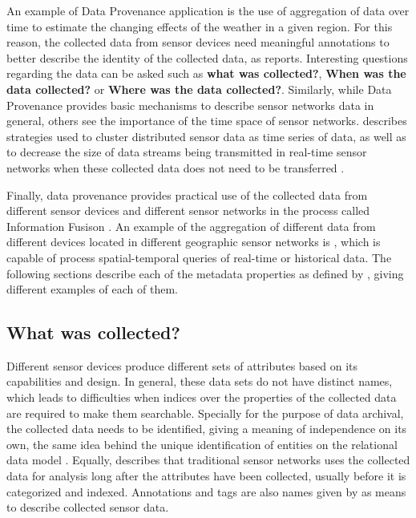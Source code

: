 An example of Data Provenance application is the use of aggregation of data
over time to estimate the changing effects of the weather in a given region.
For this reason, the collected data from sensor devices need meaningful
annotations to better describe the identity of the collected data, as 
\cite{sn-provenance} reports. Interesting questions regarding the
data can be asked such as \textbf{what was collected?}, \textbf{When was the
data collected?} or \textbf{Where was the data collected?}. Similarly, while
Data Provenance provides basic mechanisms to describe sensor networks data in
general, others see the importance of the time space of sensor networks.
\cite{sn-time-series} describes strategies used to cluster distributed sensor
data as time series of data, as well as to decrease the size of data streams
being transmitted in real-time sensor networks when these collected data does
not need to be transferred \cite{sn-data-reduction}.

Finally, data provenance provides practical use of the collected data from
different sensor devices and different sensor networks in the process called
Information Fusison \cite{sn-info-fusion}. An example of the aggregation of
different data from different devices located in different geographic sensor
networks is \cite{sn-geo-metadata}, which is capable of process
spatial-temporal queries of real-time or historical data. The following
sections describe each of the metadata properties as defined by
\cite{sn-provenance}, giving different examples of each of them.

\subsection{What was collected?}

Different sensor devices produce different sets of attributes based on its
capabilities and design. In general, these data sets do not have distinct
names, which leads to difficulties when indices over the properties of the
collected data are required to make them searchable. Specially for the purpose
of data archival, the collected data needs to be identified, giving a meaning
of independence on its own, the same idea behind the unique identification of
entities on the relational data model \cite{relational-model}. Equally,
\cite{sn-provenance} describes that traditional sensor networks uses the
collected data for analysis long after the attributes have been collected,
usually before it is categorized and indexed. Annotations and tags are also
names given by \cite{sn-provenance} as means to describe collected sensor data.

